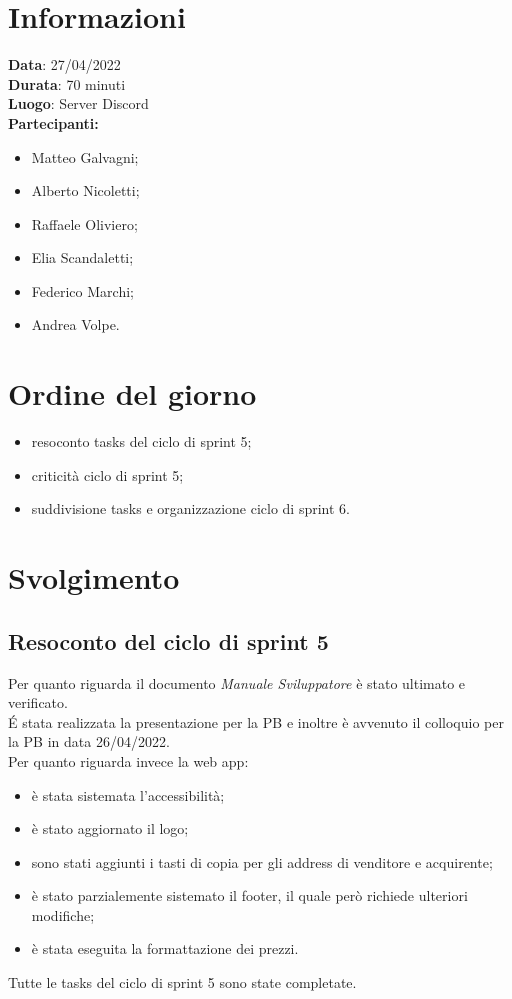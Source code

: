 \documentclass[a4paper, 12pt]{article}
\begin{document}
\makefrontpage

\section{Informazioni}
\textbf{Data}: 27/04/2022\\
\textbf{Durata}: 70 minuti\\
\textbf{Luogo}: Server Discord\\

\textbf{Partecipanti:}
\begin{itemize}
	\item Matteo Galvagni;
	\item Alberto Nicoletti;
	\item Raffaele Oliviero;
	\item Elia Scandaletti;
  \item Federico Marchi;
	\item Andrea Volpe.
\end{itemize}


\section{Ordine del giorno}
\begin{itemize}
	\item resoconto tasks del ciclo di sprint 5;
  \item criticità ciclo di sprint 5;
	\item suddivisione tasks e organizzazione ciclo di sprint 6.
\end{itemize}

\section{Svolgimento}

\subsection{Resoconto del ciclo di sprint 5}
Per quanto riguarda il documento \textit{Manuale Sviluppatore} è stato ultimato e verificato.\\
É stata realizzata la presentazione per la PB e inoltre è avvenuto il colloquio per la PB in data 26/04/2022.\\
Per quanto riguarda invece la web app:
\begin{itemize}
  \item è stata sistemata l'accessibilità;
  \item è stato aggiornato il logo;
  \item sono stati aggiunti i tasti di copia per gli address di venditore e acquirente;
  \item è stato parzialemente sistemato il footer, il quale però richiede ulteriori modifiche;
  \item è stata eseguita la formattazione dei prezzi.
\end{itemize}
Tutte le tasks del ciclo di sprint 5 sono state completate.
\end{document}
